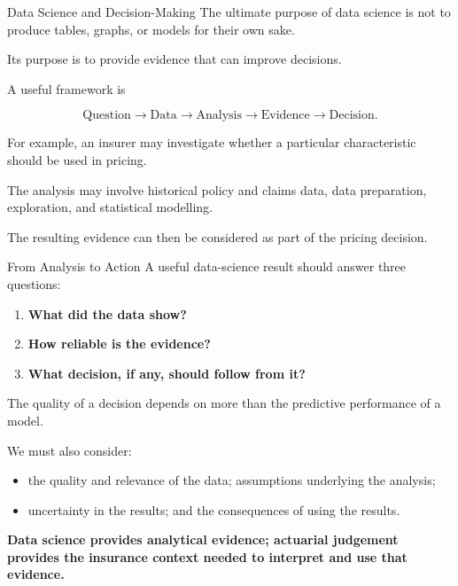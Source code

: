 \documentclass[
  ignorenonframetext,
  aspectratio=169,
]{beamer}
\providecommand{\tightlist}{%
  \setlength{\itemsep}{0pt}\setlength{\parskip}{0pt}}
\begin{document}
\begin{frame}{Data Science and Decision-Making}
\protect{}\label{data-science-and-decision-making}
The ultimate purpose of data science is not to produce tables, graphs,
or models for their own sake.

Its purpose is to provide evidence that can improve decisions.

A useful framework is

\[
\text{Question}
\rightarrow
\text{Data}
\rightarrow
\text{Analysis}
\rightarrow
\text{Evidence}
\rightarrow
\text{Decision}.
\]

For example, an insurer may investigate whether a particular
characteristic should be used in pricing.

The analysis may involve historical policy and claims data, data
preparation, exploration, and statistical modelling.

The resulting evidence can then be considered as part of the pricing
decision.
\end{frame}

\begin{frame}{From Analysis to Action}
\protect{}\label{from-analysis-to-action}
A useful data-science result should answer three questions:

\begin{enumerate}
\tightlist
\item
  \textbf{What did the data show?}
\item
  \textbf{How reliable is the evidence?}
\item
  \textbf{What decision, if any, should follow from it?}
\end{enumerate}

The quality of a decision depends on more than the predictive
performance of a model.

We must also consider:

\begin{itemize}
\tightlist
\item
  the quality and relevance of the data; assumptions underlying the
  analysis;
\item
  uncertainty in the results; and the consequences of using the results.
\end{itemize}

\begin{tcolorbox}[enhanced jigsaw, arc=.35mm, bottomrule=.15mm, bottomtitle=1mm, breakable, colback=white, colbacktitle=quarto-callout-note-color!10!white, colframe=quarto-callout-note-color-frame, coltitle=black, left=2mm, leftrule=.75mm, opacityback=0, opacitybacktitle=0.6, rightrule=.15mm, title=\textcolor{quarto-callout-note-color}{\faInfo}\hspace{0.5em}{Key idea}, titlerule=0mm, toprule=.15mm, toptitle=1mm]

\textbf{Data science provides analytical evidence; actuarial judgement
provides the insurance context needed to interpret and use that
evidence.}

\end{tcolorbox}
\end{frame}
\end{document}
